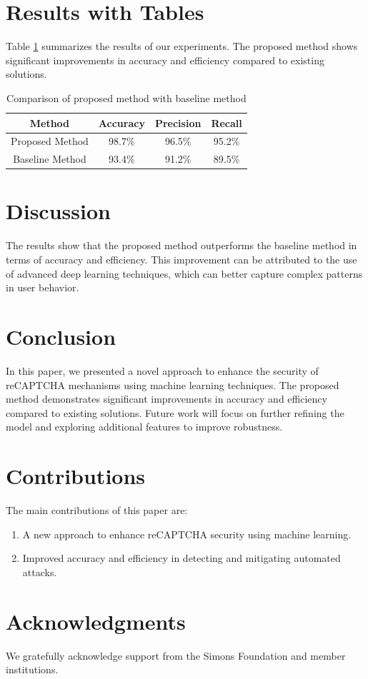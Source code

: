 \documentclass[12pt]{article}
\begin{document}
\section{Results with Tables}
Table \ref{tab:results} summarizes the results of our experiments. The proposed method shows significant improvements in accuracy and efficiency compared to existing solutions.

\begin{table}[h!]
\centering
\begin{tabular}{|c|c|c|c|}
\hline
\textbf{Method} & \textbf{Accuracy} & \textbf{Precision} & \textbf{Recall} \\
\hline
Proposed Method & 98.7\% & 96.5\% & 95.2\% \\
\hline
Baseline Method & 93.4\% & 91.2\% & 89.5\% \\
\hline
\end{tabular}
\caption{Comparison of proposed method with baseline method}
\label{tab:results}
\end{table}

\section{Discussion}
The results show that the proposed method outperforms the baseline method in terms of accuracy and efficiency. This improvement can be attributed to the use of advanced deep learning techniques, which can better capture complex patterns in user behavior.

\section{Conclusion}
In this paper, we presented a novel approach to enhance the security of reCAPTCHA mechanisms using machine learning techniques. The proposed method demonstrates significant improvements in accuracy and efficiency compared to existing solutions. Future work will focus on further refining the model and exploring additional features to improve robustness.

\section{Contributions}
The main contributions of this paper are:
\begin{enumerate}
    \item A new approach to enhance reCAPTCHA security using machine learning.
    \item Improved accuracy and efficiency in detecting and mitigating automated attacks.
\end{enumerate}

\section*{Acknowledgments}
We gratefully acknowledge support from the Simons Foundation and member institutions.



\end{document}
